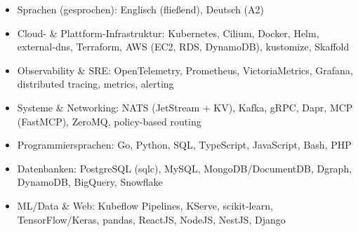\documentclass[10pt,a4paper]{resume}
\begin{document}
\begin{itemize}[leftmargin=1.4em,nosep,topsep=2pt]
  \item Sprachen (gesprochen): Englisch (fließend), Deutsch (A2)
  \item Cloud- \& Plattform-Infrastruktur: Kubernetes, Cilium, Docker, Helm, external-dns, Terraform, AWS (EC2, RDS, DynamoDB), kustomize, Skaffold
  \item Observability \& SRE: OpenTelemetry, Prometheus, VictoriaMetrics, Grafana, distributed tracing, metrics, alerting
  \item Systeme \& Networking: NATS (JetStream + KV), Kafka, gRPC, Dapr, MCP (FastMCP), ZeroMQ, policy-based routing
  \item Programmiersprachen: Go, Python, SQL, TypeScript, JavaScript, Bash, PHP
  \item Datenbanken: PostgreSQL (sqlc), MySQL, MongoDB/DocumentDB, Dgraph, DynamoDB, BigQuery, Snowflake
  \item ML/Data \& Web: Kubeflow Pipelines, KServe, scikit-learn, TensorFlow/Keras, pandas, ReactJS, NodeJS, NestJS, Django
\end{itemize}
\end{document}

